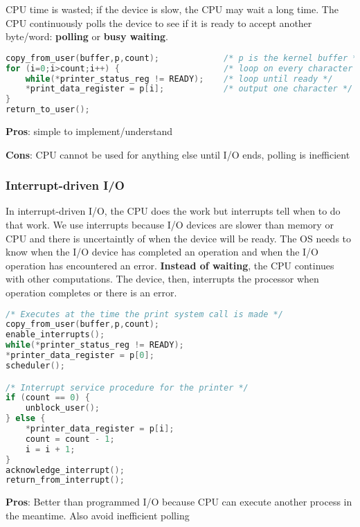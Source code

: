 \documentclass{article}
\newcommand{\bold}[1]{\textbf{#1}}
\begin{document}
CPU time is wasted; if the device is slow, the CPU may wait a long time. The CPU continuously polls the device to see if it is ready to accept another byte/word: \bold{polling} or \bold{busy waiting}. 

\begin{lstlisting}[language=C, caption=Writing a string to the printer using programmed I/O]
copy_from_user(buffer,p,count);             /* p is the kernel buffer */
for (i=0;i>count;i++) {                     /* loop on every character */
    while(*printer_status_reg != READY);    /* loop until ready */
    *print_data_register = p[i];            /* output one character */
}
return_to_user();
\end{lstlisting}

\bold{Pros}: simple to implement/understand

\bold{Cons}: CPU cannot be used for anything else until I/O ends, polling is inefficient

\subsubsection{Interrupt-driven I/O}

In interrupt-driven I/O, the CPU does the work but interrupts tell when to do that work. We use interrupts because I/O devices are slower than memory or CPU and there is uncertaintly of when the device will be ready. The OS needs to know when the I/O device has completed an operation and when the I/O operation has encountered an error. \bold{Instead of waiting}, the CPU continues with other computations. The device, then, interrupts the processor when operation completes or there is an error. 

\begin{lstlisting}[language=C, caption=Writing a string to the printer using interrupt driven I/O]
/* Executes at the time the print system call is made */
copy_from_user(buffer,p,count);
enable_interrupts();
while(*printer_status_reg != READY);
*printer_data_register = p[0];
scheduler();

/* Interrupt service procedure for the printer */
if (count == 0) {
    unblock_user();
} else {
    *printer_data_register = p[i];
    count = count - 1;
    i = i + 1;
}
acknowledge_interrupt();
return_from_interrupt();
\end{lstlisting}

\bold{Pros}: Better than programmed I/O because CPU can execute another process in the meantime. Also avoid inefficient polling
\end{document}
